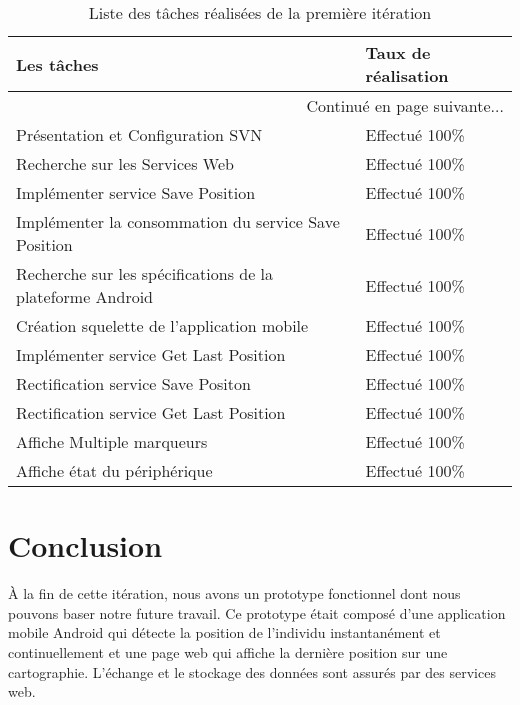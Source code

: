 \begin{center}
    \begin{longtable}{| l | l |}
        \caption{Liste des tâches réalisées de la première itération}
\label{tab:sprint1-evaluation} \\

        \hline
        \textbf{Les tâches} & \textbf{Taux de réalisation} \\ \hline
        \endhead

        \hline \multicolumn{2}{|r|}{{Continué en page suivante$\dotsc$}} \\ \hline
        \endfoot

        \hline \hline
        \endlastfoot

        \hline
Présentation et Configuration SVN & Effectué 100\% \\ \hline
Recherche sur les Services Web & Effectué 100\% \\ \hline
Implémenter service Save Position & Effectué 100\% \\ \hline
Implémenter la consommation du service Save Position & Effectué 100\% \\ \hline
Recherche sur les spécifications de la plateforme Android & Effectué 100\% \\ \hline
Création squelette de l'application mobile & Effectué 100\% \\ \hline
Implémenter service Get Last Position & Effectué 100\% \\ \hline
Rectification service Save Positon & Effectué 100\% \\ \hline
Rectification service Get Last Position & Effectué 100\% \\ \hline
Affiche Multiple marqueurs & Effectué 100\% \\ \hline
Affiche état du périphérique & Effectué 100\% \\ \hline
    \end{longtable}
\end{center}

\section*{Conclusion}

À la fin de cette itération, nous avons un prototype fonctionnel dont nous pouvons
baser notre future travail. Ce prototype était composé d'une application mobile
Android qui détecte la position de l'individu instantanément et continuellement et
une page web qui affiche la dernière position sur une cartographie. L'échange et le
stockage des données sont assurés par des services web.
